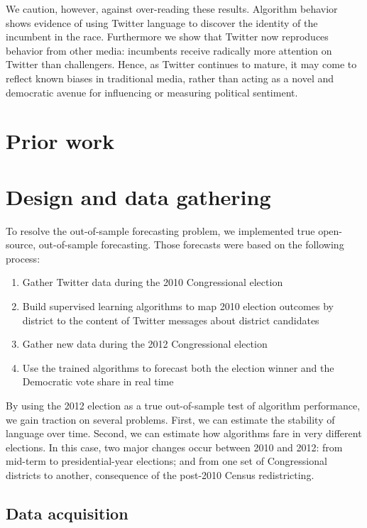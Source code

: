 \documentclass[11pt]{article}
\begin{document}
We caution, however, against over-reading these results. Algorithm
behavior shows evidence of using Twitter language to discover the
identity of the incumbent in the race. Furthermore we show that
Twitter now reproduces behavior from other media: incumbents receive
radically more attention on Twitter than challengers. Hence, as
Twitter continues to mature, it may come to reflect known biases in
traditional media, rather than acting as a novel and democratic avenue
for influencing or measuring political sentiment.

\section{Prior work}
\label{sec:prior-work}



\section{Design and data gathering}
\label{sec:design-data-gath}

To resolve the out-of-sample forecasting problem, we implemented true
open-source, out-of-sample forecasting. Those forecasts were based on
the following process:

\begin{enumerate}
\item Gather Twitter data during the 2010 Congressional election
\item Build supervised learning algorithms to map 2010 election
  outcomes by district to the content of Twitter messages about
  district candidates
\item Gather new data during the 2012 Congressional election
\item Use the trained algorithms to forecast both the election winner
  and the Democratic vote share in real time
\end{enumerate}

By using the 2012 election as a true out-of-sample test of algorithm
performance, we gain traction on several problems. First, we can
estimate the stability of language over time. Second, we can estimate
how algorithms fare in very different elections. In this case, two
major changes occur between 2010 and 2012: from mid-term to
presidential-year elections; and from one set of Congressional
districts to another, consequence of the post-2010 Census
redistricting. 

\subsection{Data acquisition}
\label{sec:data-acquisition}
\end{document}
